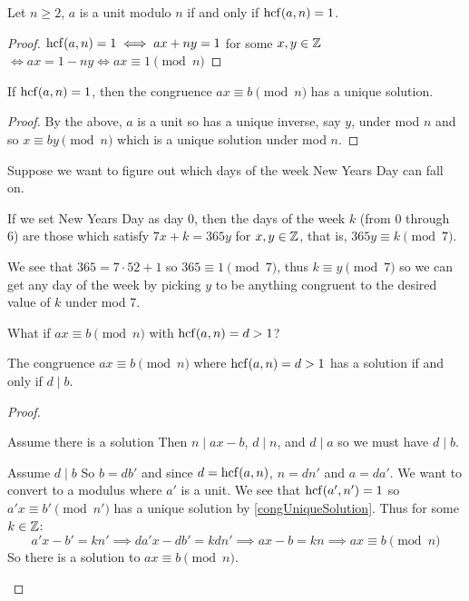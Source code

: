 \documentclass[../main.tex]{subfiles}
\begin{document}
\begin{proposition}
  Let $n \geq 2$, $a$ is a unit modulo $n$ if and only if $\operatorname{hcf}(a, n) = 1$.
\end{proposition}
\begin{proof}
  $\operatorname{hcf}(a, n) = 1 \iff ax + ny = 1$ for some $x, y \in \mathbb{Z}$
  $\iff ax = 1 - ny \iff ax \equiv 1 \pmod{n}$
\end{proof}
\begin{corollary}
  If $\operatorname{hcf}(a, n) = 1$, then the congruence $ax \equiv b \pmod{n}$ has a unique solution.
  \label{congUniqueSolution}
\end{corollary}
\begin{proof}
  By the above, $a$ is a unit so has a unique inverse, say $y$, under mod $n$ and so $x \equiv by \pmod{n}$ which is a unique solution under mod $n$.
\end{proof}
\begin{example}
  Suppose we want to figure out which days of the week New Years Day can fall on.

  If we set New Years Day as day 0, then the days of the week $k$ (from 0 through 6) are those which satisfy $7x + k = 365y$ for $x, y \in \mathbb{Z}$, that is, $365y \equiv k \pmod{7}$.

  We see that $365 = 7 \cdot 52 + 1$ so $365 \equiv 1 \pmod{7}$, thus $k \equiv y \pmod{7}$ so we can get any day of the week by picking $y$ to be anything congruent to the desired value of $k$ under mod 7.
\end{example}
What if $ax \equiv b \pmod{n}$ with $\operatorname{hcf}(a, n) = d > 1$?
\begin{proposition}
  The congruence $ax \equiv b \pmod{n}$ where $\operatorname{hcf}(a, n) = d > 1$ has a solution if and only if $d \mid b$.
\end{proposition}
\begin{proof}
  \begin{proofdirection}{Assume there is a solution}
    Then $n \mid ax - b$, $d \mid n$, and $d \mid a$ so we must have $d \mid b$.
  \end{proofdirection}
  \begin{proofdirection}{Assume $d \mid b$}
    So $b = db'$ and since $d = \operatorname{hcf}(a, n)$, $n = dn'$ and $a = da'$.
    We want to convert to a modulus where $a'$ is a unit.
    We see that $\operatorname{hcf}(a', n') = 1$ so $a'x \equiv b' \pmod{n'}$ has a unique solution by \cref{congUniqueSolution}.
    Thus for some $k \in \mathbb{Z}$:
    \[
      a'x -  b' = kn' \implies da'x - db' = kdn' \implies ax - b = kn \implies ax \equiv b \pmod{n}
    \]
    So there is a solution to $ax \equiv b \pmod{n}$.
  \end{proofdirection}
\end{proof}
\end{document}
